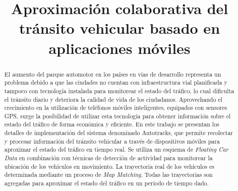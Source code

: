 \documentclass[conference,spanish]{IEEEtran}
\begin{document}
    \renewcommand{\lstlistingname}{\textbf{Consulta}}
    \renewcommand\tablename{Tabla}
  
	\title{Aproximación colaborativa del tránsito vehicular basado en aplicaciones móviles}
	
	\author{
		\and
		\and
		}

	\maketitle
	
	\begin{abstract}
El aumento del parque automotor en los países en vías de desarrollo representa un problema debido a que las ciudades no cuentan con infraestructura vial planificada y tampoco con tecnología instalada para monitorear el estado del tráfico, lo cual dificulta el tránsito diario y deteriora la calidad de vida de los ciudadanos. Aprovechando el crecimiento en la utilización de teléfonos móviles inteligentes, equipados con sensores GPS, surge la posibilidad de utilizar esta tecnología para obtener información sobre el estado del tráfico de forma económica y eficiente. En este trabajo se presentan los detalles de implementación del sistema denominado Autotracks, que permite recolectar y procesar información del tránsito vehicular a través de dispositivos móviles para aproximar el estado del tráfico en tiempo real. Se utiliza un esquema de \emph{Floating Car Data} en combinación con técnicas de detección de actividad para monitorear la ubicación de los vehículos en movimiento. La trayectoria real de los vehículos es determinada mediante un proceso de \emph{Map Matching}. Todas las trayectorias son agregadas para aproximar el estado del tráfico en un período de tiempo dado.
	\end{abstract}
	
\end{document}
